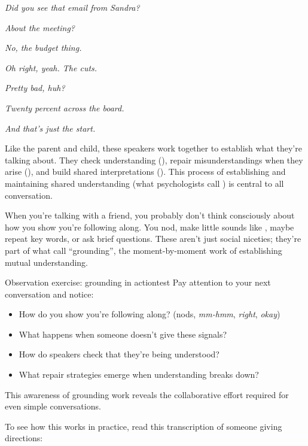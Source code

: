 \ea
\begin{dialogue}
\item[A] \emph{Did you see that email from Sandra?}
\item[B] \emph{About the meeting?}
\item[A] \emph{No, the budget thing.}
\item[B] \emph{Oh right, yeah. The cuts.}
\item[A] \emph{Pretty bad, huh?}
\item[B] \emph{Twenty percent across the board.}
\item[A] \emph{And that's just the start.}
\end{dialogue}
\z
Like the parent and child, these speakers work together to establish what they're talking about. They check understanding (), repair misunderstandings when they arise (), and build shared interpretations (). This process of establishing and maintaining shared understanding (what psychologists call ) is central to all conversation.

When you're talking with a friend, you probably don't think consciously about how you show you're following along. You nod, make little sounds like , maybe repeat key words, or ask brief questions. These aren't just social niceties; they're part of what \citet{clark1991} call \enquote{grounding}, the moment-by-moment work of establishing mutual understanding.

\begin{tblsframedsymbol}{Observation exercise: grounding in action}{test}
Pay attention to your next conversation and notice:
\begin{itemize}[noitemsep, leftmargin=*]
    \item How do you show you're following along? (nods, \emph{mm-hmm}, \emph{right}, \emph{okay})
    \item What happens when someone doesn't give these signals?
    \item How do speakers check that they're being understood?
    \item What repair strategies emerge when understanding breaks down?
\end{itemize}
This awareness of grounding work reveals the collaborative effort required for even simple conversations.
\end{tblsframedsymbol}

To see how this works in practice, read this transcription of someone giving directions:

